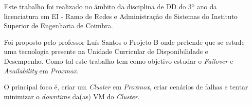 
Este trabalho foi realizado no âmbito da disciplina de \ac{DD} do 3º ano da licenciatura em \ac{EI} - Ramo de Redes e Administração de Sistemas do Instituto Superior de Engenharia de Coimbra.

Foi proposto pelo professor Luís Santos o Projeto B onde pretende que se estude uma tecnologia presente na Unidade Curricular de Disponibilidade e Desempenho. Como tal este trabalho tem como objetivo estudar o \textit{Failover} e \textit{Availability} em \textit{Proxmox}. 

O principal foco é, criar um \textit{Cluster} em \textit{Proxmox}, criar cenários de falhas e tentar minimizar o \textit{downtime} da(as) \ac{VM} do \textit{Cluster}.